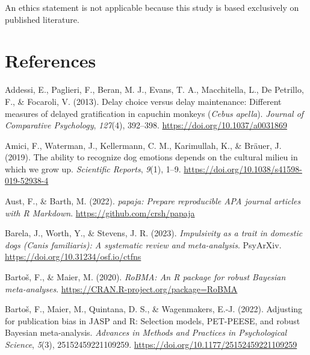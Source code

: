 \documentclass[
  ,pub,floatsintext]{apa6}
\newlength{\cslhangindent}
\newlength{\cslentryspacingunit} %
\newenvironment{CSLReferences}[2] %
 {%
  \setlength{\parindent}{0pt}
  \ifodd #1
  \let\oldpar\par
  \def\par{\hangindent=\cslhangindent\oldpar}
  \fi
  \setlength{\parskip}{#2\cslentryspacingunit}
 }%
 {}
\begin{document}
An ethics statement is not applicable because this study is based exclusively on published literature.

\hypertarget{references}{%
\section{References}\label{references}}

\scriptsize

\hypertarget{refs}{}
\begin{CSLReferences}{1}{0}
\leavevmode{}%
Addessi, E., Paglieri, F., Beran, M. J., Evans, T. A., Macchitella, L., De Petrillo, F., \& Focaroli, V. (2013). Delay choice versus delay maintenance: Different measures of delayed gratification in capuchin monkeys (\emph{{Cebus} apella}). \emph{Journal of Comparative Psychology}, \emph{127}(4), 392--398. \url{https://doi.org/10.1037/a0031869}

\leavevmode{}%
Amici, F., Waterman, J., Kellermann, C. M., Karimullah, K., \& Bräuer, J. (2019). The ability to recognize dog emotions depends on the cultural milieu in which we grow up. \emph{Scientific Reports}, \emph{9}(1), 1--9. \url{https://doi.org/10.1038/s41598-019-52938-4}

\leavevmode{}%
Aust, F., \& Barth, M. (2022). \emph{{papaja}: {Prepare} reproducible {APA} journal articles with {R Markdown}}. \url{https://github.com/crsh/papaja}

\leavevmode{}%
Barela, J., Worth, Y., \& Stevens, J. R. (2023). \emph{Impulsivity as a trait in domestic dogs ({Canis} familiaris): A systematic review and meta-analysis}. PsyArXiv. \url{https://doi.org/10.31234/osf.io/ctfns}

\leavevmode{}%
Bartoš, F., \& Maier, M. (2020). \emph{RoBMA: An {R} package for robust {Bayesian} meta-analyses}. \url{https://CRAN.R-project.org/package=RoBMA}

\leavevmode{}%
Bartoš, F., Maier, M., Quintana, D. S., \& Wagenmakers, E.-J. (2022). Adjusting for publication bias in {JASP} and {R}: Selection models, {PET-PEESE}, and robust {Bayesian} meta-analysis. \emph{Advances in Methods and Practices in Psychological Science}, \emph{5}(3), 25152459221109259. \url{https://doi.org/10.1177/25152459221109259}


\end{CSLReferences}
\end{document}
